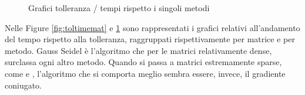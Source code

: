 \begin{figure}%
	\centering
	\qquad
	\caption{Grafici tolleranza / tempi rispetto i singoli metodi}%
	\label{fig:toltimemet}
\end{figure}

Nelle Figure \ref{fig:toltimemat} e \ref{fig:toltimemet} sono rappresentati i grafici relativi all'andamento del tempo rispetto alla tolleranza, raggruppati rispettivamente per matrice e per metodo.
Gauss Seidel è l'algoritmo che per le matrici relativamente dense, surclassa ogni altro metodo. Quando si passa a matrici estremamente sparse, come  e , l'algoritmo che si comporta meglio sembra essere, invece, il gradiente coniugato.

